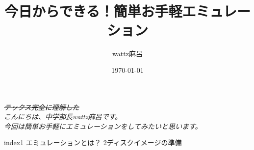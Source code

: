 \documentclass[b5paper,9pt,platex,dvipdfmx]{jsarticle}
\begin{document}
\title{今日からできる！簡単お手軽エミュレーション}
\author{wattz麻呂}
\date{\today}
\maketitle
\thispagestyle{empty}

\begin{multicols*}{3}
  
\it  \sout{テックス完全に理解した} \sc \\
こんにちは、中学部長wattz麻呂です。\\
今回は簡単お手軽にエミュレーションをしてみたいと思います。\\
\begin{itembox}{index}{1}
エミュレーションとは？
{2}ディスクイメージの準備
\end{itembox}

\end{multicols*}
\end{document}
